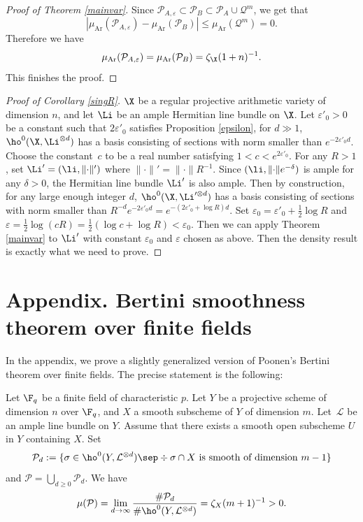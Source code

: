\begin{proof}[Proof of Theorem \ref{mainvar}]
Since $\mathcal{P}_{A,\varepsilon}\subset \mathcal{P}_B\subset \mathcal{P}_A\cup \mathcal{Q}^m$, we get that
\[
|\mu_{\mathrm{Ar}}(\mathcal{P}_{A,\varepsilon})-\mu_{\mathrm{Ar}}(\mathcal{P}_B)|\leq \mu_{\mathrm{Ar}}(\mathcal{Q}^m)=0.
\]
Therefore we have
\[
\mu_{\mathrm{Ar}}(\mathcal{P}_{A,\varepsilon})=\mu_{\mathrm{Ar}}(\mathcal{P}_B)=\zeta_{\X}(1+n)^{-1}.
\]
This finishes the proof.
\end{proof}

\begin{proof}[Proof of Corollary \ref{singR}] $\X$ be a regular projective arithmetic variety of dimension $n$, and let $\Li$ be an ample Hermitian line bundle on $\X$. Let $\varepsilon'_0>0$ be a constant such that $2\varepsilon'_0$ satisfies Proposition \ref{epsilon}, \ie for $d\gg 1$, $\ho^0(\X, \Li^{\otimes d})$ has a basis consisting of sections with norm smaller than $e^{-2\varepsilon'_0 d}$. Choose the constant~$c$ to be a real number satisfying $1<c<e^{2\varepsilon'_0}$. For any $R>1$, set $\Li'=(\li, \lVert\cdot\rVert')$ where $\lVert\cdot\rVert'=\lVert\cdot\rVert R^{-1}$. Since $(\li, \lVert\cdot\rVert e^{-\delta})$ is ample for any $\delta>0$, the Hermitian line bundle $\Li'$ is also ample. Then by construction, for any large enough integer $d$, $\ho^0(\X, \Li'^{\otimes d})$ has a basis consisting of sections with norm smaller than $R^{-d}e^{-2\varepsilon'_0 d}=e^{-(2\varepsilon'_0+\log R)d}$. Set $\varepsilon_0=\varepsilon'_0+\frac{1}{2}\log R$ and  $\varepsilon=\frac{1}{2}\log(cR)=\frac{1}{2}(\log c+\log R)<\varepsilon_0$. Then we can apply Theorem \ref{mainvar} to $\Li'$ with constant $\varepsilon_0$ and $\varepsilon$ chosen as above. Then the density result is exactly what we need to prove.
\end{proof}

\appendix
\section*{Appendix. Bertini smoothness theorem over finite fields}\label{finitefield}

In the appendix, we prove a slightly generalized version of Poonen's Bertini theorem over finite fields. The precise statement is the following:

\begin{thm}\label{bertinifini}
Let $\F_q$ be a finite field of characteristic $p$. Let $Y$ be a projective scheme of dimension $n$ over $\F_q$, and $X$ a smooth subscheme of $Y$ of dimension $m$. Let~$\mathcal{L}$ be an ample line bundle on $Y$. Assume that there exists a smooth open subscheme $U$ in $Y$ containing $X$.
Set
\[
\mathcal{P}_{d}:=\{\sigma\in \ho^0(Y, \mathcal{L}^{\otimes d})\sep \div \sigma\cap X \text{ is smooth of dimension }m-1\}
\]
and $\mathcal{P}=\bigcup_{d\geq 0}\mathcal{P}_{d}$.
We have
\[
\mu(\mathcal{P})=\lim_{d\to \infty} \frac{ \#\mathcal{P}_{d}}{\# \ho^0(Y, \mathcal{L}^{\otimes d})}
=\zeta_X(m+1)^{-1}>0.
\]
\end{thm}

